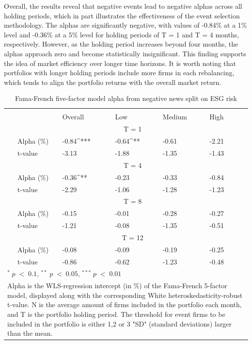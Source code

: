 Overall, the results reveal that negative events lead to negative alphas across all holding periods, which in part illustrates the effectiveness of the event selection methodology. The alphas are significantly negative, with values of -0.84\% at a 1\% level and -0.36\% at a 5\% level for holding periods of T = 1 and T = 4 months, respectively. However, as the holding period increases beyond four months, the alphas approach zero and become statistically insignificant. This finding supports the idea of market efficiency over longer time horizons. It is worth noting that portfolios with longer holding periods include more firms in each rebalancing, which tends to align the portfolio returns with the overall market return. 

\setlength{\tabcolsep}{15pt}
\begin{table}[H]
\small
\centering
\caption{Fama-French five-factor model alpha from negative news split on ESG risk} 
\begin{tabular}{llllllc}
\hline \hline \\ 
 &     & Overall &    Low  &  Medium  &  High &  \\    \cline{3-6} 
& &  \multicolumn{3}{c}{ T = 1} & \\ \cline{2-6}
& Alpha (\%)    & -0.84^{***} & -0.64^{**}  & -0.61  & -2.21 &  \\ 
& t-value   & -3.13 & -1.88 & -1.35  & -1.43 &  \\
& &  \multicolumn{3}{c}{ T = 4} & \\ \cline{2-6}
& Alpha (\%)   & -0.36^{**} & -0.23  & -0.33  &  -0.84 & \\
& t-value &   -2.29 & -1.06 & -1.28  & -1.23 & \\
& &  \multicolumn{3}{c}{ T = 8} & \\ \cline{2-6}
& Alpha (\%)    & -0.15 & -0.01   & -0.28  & -0.27 &  \\
& t-value &   -1.21 & -0.08  & -1.35 & -0.51 &  \\
& &  \multicolumn{3}{c}{ T = 12} & \\ \cline{2-6}
& Alpha (\%)    & -0.08 & -0.09  & -0.19  & -0.25 &  \\
& t-value &    -0.86 & -0.62  & -1.23 & -0.48 &  \\
\hline \hline
 \multicolumn{7}{l}{ \footnotesize $^* \; p\; <\; 0.1$, $ ^{**} \; p\; <\; 0.05$, $ ^{***} \; p\; <\; 0.01$  } \\
 \multicolumn{7}{p{12cm}}{ \footnotesize Alpha is the WLS-regression intercept (in \%) of the Fama-French 5-factor model, displayed along with the corresponding White heteroskedasticity-robust t-value. N is the average amount of firms included in the portfolio each month, and T is the portfolio holding period. The threshold for event firms to be included in the portfolio is either 1,2 or 3 "SD" (standard deviations) larger than the mean.} \\ 
 \hline
\end{tabular}
\label{tab: FF5_neg_ESG}
\end{table}


